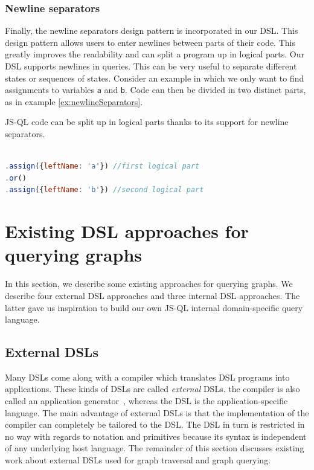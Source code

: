 \subsubsection*{Newline separators}

Finally, the newline separators design pattern is incorporated in our DSL. This design pattern allows users to enter newlines between parts of their code. This greatly improves the readability and can split a program up in logical parts. Our DSL supports newlines in queries. This can be very useful to separate different states or sequences of states. Consider an example in which we only want to find assignments to variables \texttt{a} and \texttt{b}. Code can then be divided in two distinct parts, as in example \ref{ex:newlineSeparators}.

\begin{exmp}
\label{ex:newlineSeparators}
JS-QL code can be split up in logical parts thanks to its support for newline separators.
\begin{lstlisting}[label={lst:newlineSeparators},language=JavaScript,caption=Newline separators,mathescape=true]  % float=t?

.assign({leftName: 'a'}) //first logical part
.or()
.assign({leftName: 'b'}) //second logical part
\end{lstlisting}
\end{exmp}


\section{Existing DSL approaches for querying graphs}

In this section, we describe some existing approaches for querying graphs. We describe four external DSL approaches and three internal DSL approaches. The latter gave us inspiration to build our own JS-QL internal domain-specific query language.

\subsection{External DSLs}

Many DSLs come along with a compiler which translates DSL programs into applications. These kinds of DSLs are called \textit{external} DSLs. the compiler is also called an application generator~\cite{Cleaveland:1988}, whereas the DSL is the application-specific language. The main advantage of external DSLs is that the implementation of the compiler can completely be tailored to the DSL. The DSL in turn is restricted in no way with regards to notation and primitives because its syntax is independent of any underlying host language. The remainder of this section discusses existing work about external DSLs used for graph traversal and graph querying.

